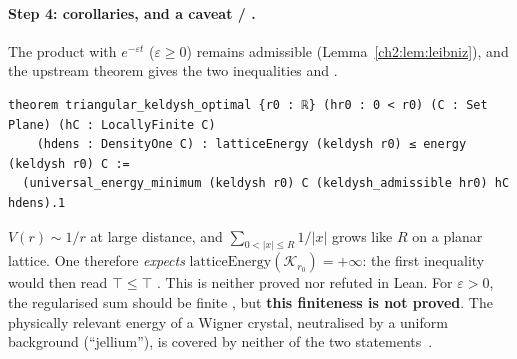 \paragraph{Step 4: corollaries, and a caveat \tierA{} / \tierC.} The product with $e^{-\varepsilon t}$
($\varepsilon\ge0$) remains admissible (Lemma~\ref{ch2:lem:leibniz}), and the upstream theorem gives the two inequalities
 and .
\begin{leanbox}
\begin{lstlisting}[style=chdeux]
theorem triangular_keldysh_optimal {r0 : ℝ} (hr0 : 0 < r0) (C : Set Plane) (hC : LocallyFinite C)
    (hdens : DensityOne C) : latticeEnergy (keldysh r0) ≤ energy (keldysh r0) C :=
  (universal_energy_minimum (keldysh r0) C (keldysh_admissible hr0) hC hdens).1
\end{lstlisting}
\end{leanbox}
\begin{warnbox}[: $\top\le\top$]
$V(r)\sim1/r$ at large distance, and $\sum_{0<|x|\le R}1/|x|$ grows like $R$ on a planar lattice. One therefore
\emph{expects} $\mathrm{latticeEnergy}(\mathcal K_{r_0})=+\infty$: the first inequality would then read $\top\le\top$
\tierC. This is neither proved nor refuted in Lean. For $\varepsilon>0$, the regularised sum should be finite \tierC,
but \textbf{this finiteness is not proved}. The physically relevant energy of a Wigner crystal, neutralised
by a uniform background (``jellium''), is covered by neither of the two statements~\cite{ch2kel}.
\end{warnbox}

